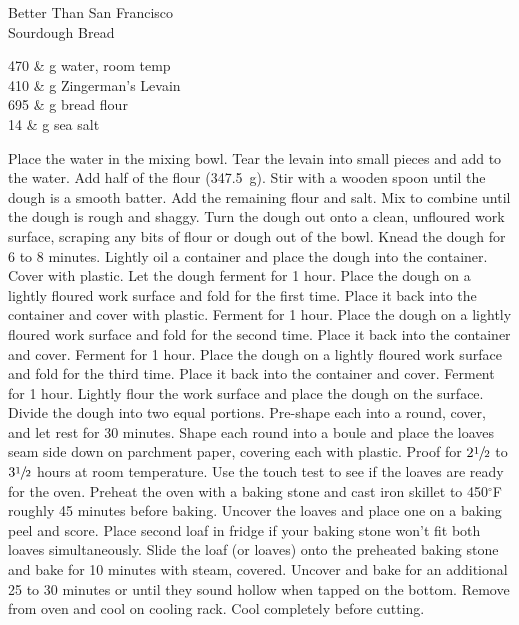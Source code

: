 \setHeadlines
{
}

\begin{recipe}
[ %
    source = Zingerman's via Jim,
]
{Better Than San Francisco \\Sourdough Bread}

    \ingredients
    {
		470 & g water, room temp \\
		410 & g Zingerman's Levain \\
		695 & g bread flour \\
		14 & g sea salt \\
    }
    
    \preparation
    {
        \step Place the water in the mixing bowl. Tear the levain into small pieces and add to the water. Add half of the flour (347.5~g). Stir with a wooden spoon until the dough is a smooth batter. Add the remaining flour and salt. Mix to combine until the dough is rough and shaggy. 
		\step Turn the dough out onto a clean, unfloured work surface, scraping any bits of flour or dough out of the bowl. Knead the dough for 6 to 8 minutes. 
		\step Lightly oil a container and place the dough into the container. Cover with plastic. Let the dough ferment for 1 hour. 
		\step Place the dough on a lightly floured work surface and fold for the first time. Place it back into the container and cover with plastic. Ferment for 1 hour. 
		\step Place the dough on a lightly floured work surface and fold for the second time. Place it back into the container and cover. Ferment for 1 hour. 
		\step Place the dough on a lightly floured work surface and fold for the third time. Place it back into the container and cover. Ferment for 1 hour. 
		\step Lightly flour the work surface and place the dough on the surface. Divide the dough into two equal portions. Pre-shape each into a round, cover, and let rest for 30 minutes. 
		\step Shape each round into a boule and place the loaves seam side down on parchment paper, covering each with plastic. Proof for $2\sfrac{1}{2}$ to $3\sfrac{1}{2}$ hours at room temperature. Use the touch test to see if the loaves are ready for the oven. 
		\step Preheat the oven with a baking stone and cast iron skillet to 450$^{\circ}$F roughly 45 minutes before baking. 
		\step Uncover the loaves and place one on a baking peel and score. Place second loaf in fridge if your baking stone won't fit both loaves simultaneously. 
		\step Slide the loaf (or loaves) onto the preheated baking stone and bake for 10 minutes with steam, covered. Uncover and bake for an additional 25 to 30 minutes or until they sound hollow when tapped on the bottom. Remove from oven and cool on cooling rack. Cool completely before cutting. 
    }


\end{recipe}
